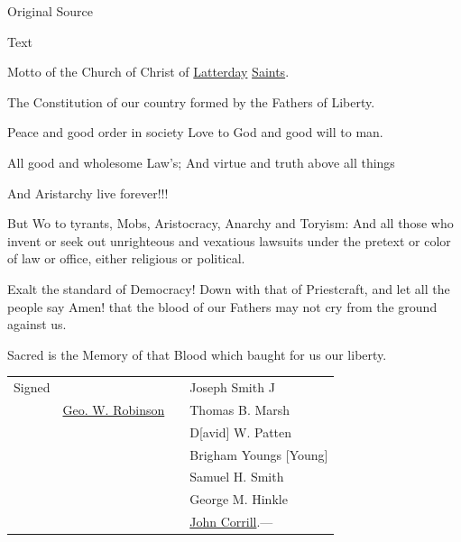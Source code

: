 				\begin{description}
					\item[Original Source]
				\end{description}
				
				
				\begin{description}
					\item[Text]
				\end{description}
				
					Motto of the Church of Christ of \uline{Latterday} \uline{Saints}.

					The Constitution of our country formed by the Fathers of Liberty.

					Peace and good order in society Love to God and good will to man.

					All good and wholesome Law's; And virtue and truth above all things

					And Aristarchy live forever!!!

					But Wo to tyrants, Mobs, Aristocracy, Anarchy and Toryism: And all those who invent or seek out unrighteous and vexatious lawsuits under the pretext or color of law or office, either religious or political.
					
					Exalt the standard of Democracy! Down with that of Priestcraft, and let all the people say Amen! that the blood of our Fathers may not cry from the ground against us.

					Sacred is the Memory of that Blood which baught for us our liberty.

					\begin{tabular}{p{3cm}p{3cm}p{4cm}p{4cm}}
					Signed &  &  & Joseph Smith J\supersu{r}\supers{.} \\
					 & \uline{Geo. W. Robinson} &  & Thomas B. Marsh \\
					 &  &  & D[avid] W. Patten \\
					 &  &  & Brigham Youngs [Young] \\
					 &  &  & Samuel H. Smith \\
					 &  &  & George M. Hinkle \\
					 &  &  & \uline{John Corrill}.---
					\end{tabular}
					
